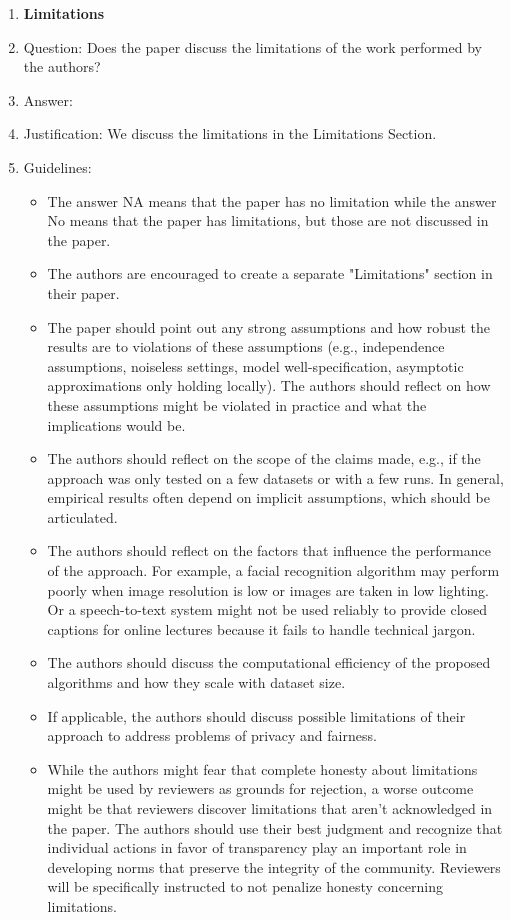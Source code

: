 \documentclass{article}
\theoremstyle{plain}
\theoremstyle{definition}
\theoremstyle{remark}
\begin{document}
\begin{enumerate}
\item {\bf Limitations}
    \item[] Question: Does the paper discuss the limitations of the work performed by the authors?
    \item[] Answer: \answerYes{} %
    \item[] Justification: We discuss the limitations in the Limitations Section.
    \item[] Guidelines:
    \begin{itemize}
        \item The answer NA means that the paper has no limitation while the answer No means that the paper has limitations, but those are not discussed in the paper. 
        \item The authors are encouraged to create a separate "Limitations" section in their paper.
        \item The paper should point out any strong assumptions and how robust the results are to violations of these assumptions (e.g., independence assumptions, noiseless settings, model well-specification, asymptotic approximations only holding locally). The authors should reflect on how these assumptions might be violated in practice and what the implications would be.
        \item The authors should reflect on the scope of the claims made, e.g., if the approach was only tested on a few datasets or with a few runs. In general, empirical results often depend on implicit assumptions, which should be articulated.
        \item The authors should reflect on the factors that influence the performance of the approach. For example, a facial recognition algorithm may perform poorly when image resolution is low or images are taken in low lighting. Or a speech-to-text system might not be used reliably to provide closed captions for online lectures because it fails to handle technical jargon.
        \item The authors should discuss the computational efficiency of the proposed algorithms and how they scale with dataset size.
        \item If applicable, the authors should discuss possible limitations of their approach to address problems of privacy and fairness.
        \item While the authors might fear that complete honesty about limitations might be used by reviewers as grounds for rejection, a worse outcome might be that reviewers discover limitations that aren't acknowledged in the paper. The authors should use their best judgment and recognize that individual actions in favor of transparency play an important role in developing norms that preserve the integrity of the community. Reviewers will be specifically instructed to not penalize honesty concerning limitations.
    \end{itemize}


\end{enumerate}
\end{document}
